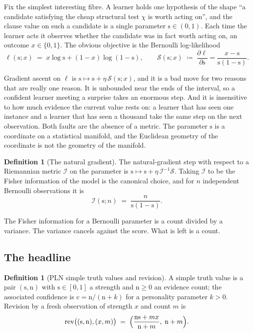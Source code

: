 \documentclass[11pt,a4paper]{article}
\theoremstyle{plain}
\theoremstyle{definition}
\newtheorem{definition}[theorem]{Definition}
\theoremstyle{remark}
\newcommand{\str}{\mathrm{s}}
\newcommand{\conf}{\mathrm{c}}
\newcommand{\ev}{\mathrm{n}}
\newcommand{\Fish}{\mathcal{I}}
\newcommand{\Score}{\mathcal{S}}
\begin{document}
Fix the simplest interesting fibre. A learner holds one hypothesis of the shape
``a candidate satisfying the cheap structural test $\chi$ is worth acting on'',
and the clause value on such a candidate is a single parameter $\str \in (0,1)$.
Each time the learner acts it observes whether the candidate was in fact worth
acting on, an outcome $x \in \{0,1\}$. The obvious objective is the Bernoulli
log-likelihood
\[
\ell(\str; x) \;=\; x\log \str + (1-x)\log(1-\str),
\qquad
\Score(\str;x) \;\coloneqq\; \frac{\partial \ell}{\partial \str}
= \frac{x - \str}{\str(1-\str)} .
\]

Gradient ascent on $\ell$ is $\str \mapsto \str + \eta\,\Score(\str;x)$, and it is
a bad move for two reasons that are really one reason. It is unbounded near the
ends of the interval, so a confident learner meeting a surprise takes an enormous
step. And it is insensitive to how much evidence the current value rests on: a
learner that has seen one instance and a learner that has seen a thousand take
the same step on the next observation. Both faults are the absence of a metric.
The parameter $\str$ is a coordinate on a statistical manifold, and the Euclidean
geometry of the coordinate is not the geometry of the manifold.

\begin{definition}[The natural gradient]\label{def:natgrad}
The natural-gradient step with respect to a Riemannian metric $\Fish$ on the
parameter is $\str \mapsto \str + \eta\,\Fish^{-1}\Score$. Taking $\Fish$ to be
the Fisher information of the model is the canonical choice, and for $n$
independent Bernoulli observations it is
\[
\Fish(\str; n) \;=\; \frac{n}{\str(1-\str)} .
\]
\end{definition}

The Fisher information for a Bernoulli parameter is a count divided by a variance.
The variance cancels against the score. What is left is a count.

\subsection{The headline}

\begin{definition}[PLN simple truth values and revision]\label{def:pln}
A simple truth value is a pair $(\str, \ev)$ with $\str \in [0,1]$ a strength and
$\ev \ge 0$ an evidence count; the associated confidence is
$\conf = \ev/(\ev+k)$ for a personality parameter $k > 0$. Revision by a fresh
observation of strength $x$ and count $m$ is
\[
\mathrm{rev}\bigl((\str,\ev),(x,m)\bigr)
\;=\; \Bigl(\frac{\ev\str + m x}{\ev + m},\; \ev + m\Bigr).
\]
\end{definition}
\end{document}
